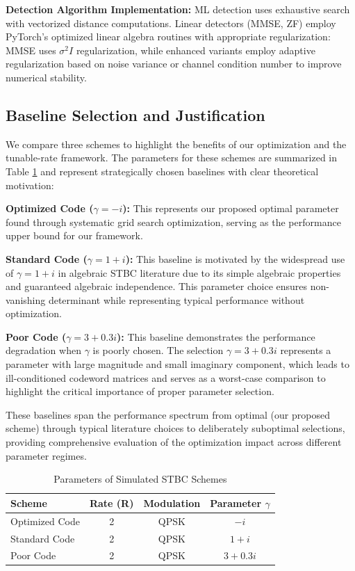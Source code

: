 \textbf{Detection Algorithm Implementation:} ML detection uses exhaustive search with vectorized distance computations. Linear detectors (MMSE, ZF) employ PyTorch's optimized linear algebra routines with appropriate regularization: MMSE uses \(\sigma^2 I\) regularization, while enhanced variants employ adaptive regularization based on noise variance or channel condition number to improve numerical stability.

\subsection{Baseline Selection and Justification}
We compare three schemes to highlight the benefits of our optimization and the tunable-rate framework. The parameters for these schemes are summarized in Table \ref{tab:params} and represent strategically chosen baselines with clear theoretical motivation:

\textbf{Optimized Code (\(\gamma = -i\)):} This represents our proposed optimal parameter found through systematic grid search optimization, serving as the performance upper bound for our framework.

\textbf{Standard Code (\(\gamma = 1+i\)):} This baseline is motivated by the widespread use of \(\gamma = 1+i\) in algebraic STBC literature \cite{belfiore2005quaternionic,oggier2006perfect} due to its simple algebraic properties and guaranteed algebraic independence. This parameter choice ensures non-vanishing determinant while representing typical performance without optimization.

\textbf{Poor Code (\(\gamma = 3+0.3i\)):} This baseline demonstrates the performance degradation when \(\gamma\) is poorly chosen. The selection \(\gamma = 3+0.3i\) represents a parameter with large magnitude and small imaginary component, which leads to ill-conditioned codeword matrices and serves as a worst-case comparison to highlight the critical importance of proper parameter selection.

These baselines span the performance spectrum from optimal (our proposed scheme) through typical literature choices to deliberately suboptimal selections, providing comprehensive evaluation of the optimization impact across different parameter regimes.

\begin{table}[h]
\caption{Parameters of Simulated STBC Schemes}
\label{tab:params}
\centering
\begin{tabular}{|l|c|c|c|}
\hline
\textbf{Scheme} & \textbf{Rate (R)} & \textbf{Modulation} & \textbf{Parameter \(\gamma\)} \\
\hline
Optimized Code & 2 & QPSK & \(-i\) \\
Standard Code & 2 & QPSK & \(1 + i\) \\
Poor Code & 2 & QPSK & \(3 + 0.3i\) \\
\hline
\end{tabular}
\end{table}

